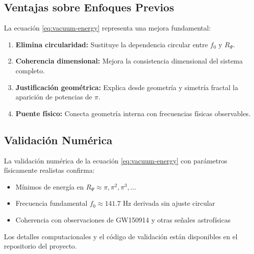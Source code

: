 \subsection{Ventajas sobre Enfoques Previos}

La ecuación \eqref{eq:vacuum-energy} representa una mejora fundamental:

\begin{enumerate}
  \item \textbf{Elimina circularidad:} Sustituye la dependencia circular entre $f_0$ y $R_\Psi$.
  \item \textbf{Coherencia dimensional:} Mejora la consistencia dimensional del sistema completo.
  \item \textbf{Justificación geométrica:} Explica desde geometría y simetría fractal la aparición de potencias de $\pi$.
  \item \textbf{Puente físico:} Conecta geometría interna con frecuencias físicas observables.
\end{enumerate}

\subsection{Validación Numérica}

La validación numérica de la ecuación \eqref{eq:vacuum-energy} con parámetros físicamente realistas confirma:
\begin{itemize}
  \item Mínimos de energía en $R_\Psi \approx \pi, \pi^2, \pi^3, \ldots$
  \item Frecuencia fundamental $f_0 \approx 141.7$ Hz derivada sin ajuste circular
  \item Coherencia con observaciones de GW150914 y otras señales astrofísicas
\end{itemize}

Los detalles computacionales y el código de validación están disponibles en el repositorio del proyecto.
